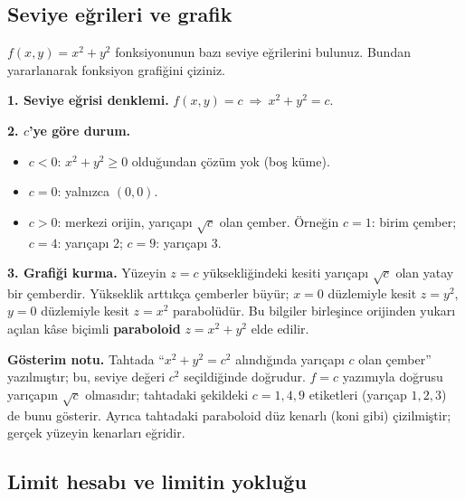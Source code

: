 \subsection{Seviye eğrileri ve grafik}

\begin{soru}
$f(x,y)=x^2+y^2$ fonksiyonunun bazı seviye eğrilerini bulunuz. Bundan yararlanarak fonksiyon grafiğini çiziniz.
\end{soru}
\begin{cevap}
\textbf{1. Seviye eğrisi denklemi.} $f(x,y)=c\ \Rightarrow\ x^2+y^2=c$.

\textbf{2. $c$'ye göre durum.}
\begin{itemize}
  \item $c<0$: $x^2+y^2\ge0$ olduğundan çözüm yok (boş küme).
  \item $c=0$: yalnızca $(0,0)$.
  \item $c>0$: merkezi orijin, yarıçapı $\sqrt c$ olan çember. Örneğin $c=1$: birim çember; $c=4$: yarıçapı $2$;
        $c=9$: yarıçapı $3$.
\end{itemize}
\textbf{3. Grafiği kurma.} Yüzeyin $z=c$ yüksekliğindeki kesiti yarıçapı $\sqrt c$ olan yatay bir çemberdir. Yükseklik
arttıkça çemberler büyür; $x=0$ düzlemiyle kesit $z=y^2$, $y=0$ düzlemiyle kesit $z=x^2$ parabolüdür. Bu bilgiler
birleşince orijinden yukarı açılan kâse biçimli \textbf{paraboloid} $z=x^2+y^2$ elde edilir.

\textbf{Gösterim notu.} Tahtada ``$x^2+y^2=c^2$ alındığında yarıçapı $c$ olan çember'' yazılmıştır; bu, seviye değeri
$c^2$ seçildiğinde doğrudur. $f=c$ yazımıyla doğrusu yarıçapın $\sqrt c$ olmasıdır; tahtadaki şekildeki $c=1,4,9$
etiketleri (yarıçap $1,2,3$) de bunu gösterir. Ayrıca tahtadaki paraboloid düz kenarlı (koni gibi) çizilmiştir;
gerçek yüzeyin kenarları eğridir.
\end{cevap}

\subsection{Limit hesabı ve limitin yokluğu}

